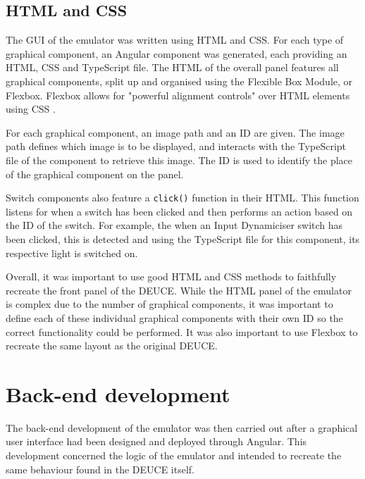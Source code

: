 \documentclass{l4proj}
\begin{document}
\subsection{HTML and CSS}
The GUI of the emulator was written using HTML and CSS. For each type of graphical component, an Angular component was generated, each providing an HTML, CSS and TypeScript file. The HTML of the overall panel features all graphical components, split up and organised using the Flexible Box Module, or Flexbox. Flexbox allows for "powerful alignment controls" over HTML elements using CSS \citep{Mozilla19}.

For each graphical component, an image path and an ID are given. The image path defines which image is to be displayed, and interacts with the TypeScript file of the component to retrieve this image. The ID is used to identify the place of the graphical component on the panel.

Switch components also feature a \texttt{click()} function in their HTML. This function listens for when a switch has been clicked and then performs an action based on the ID of the switch. For example, the when an Input Dynamiciser switch has been clicked, this is detected and using the TypeScript file for this component, its respective light is switched on.

Overall, it was important to use good HTML and CSS methods to faithfully recreate the front panel of the DEUCE. While the HTML panel of the emulator is complex due to the number of graphical components, it was important to define each of these individual graphical components with their own ID so the correct functionality could be performed. It was also important to use Flexbox to recreate the same layout as the original DEUCE.

\section{Back-end development}
The back-end development of the emulator was then carried out after a graphical user interface had been designed and deployed through Angular. This development concerned the logic of the emulator and intended to recreate the same behaviour found in the DEUCE itself.
\end{document}
